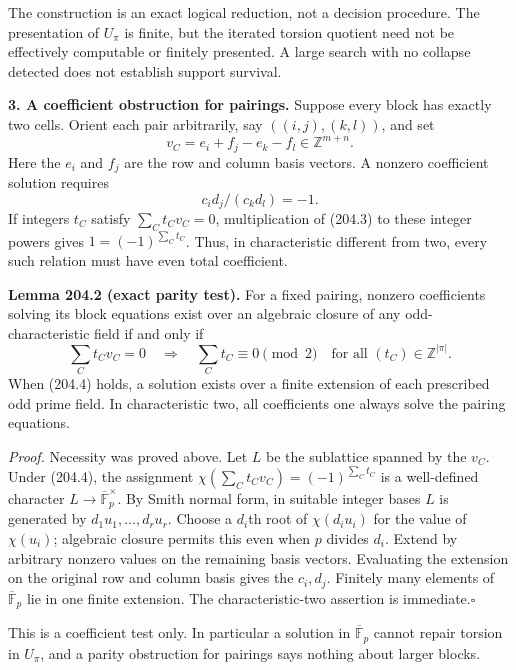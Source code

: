 \documentclass[11pt,a4paper]{article}
\newcommand{\Z}{\mathbb{Z}}
\newcommand{\F}{\mathbb{F}}
\begin{document}
The construction is an exact logical reduction, not a decision procedure.
The presentation of $U_\pi$ is finite, but the iterated torsion quotient
need not be effectively computable or finitely presented. A large search
with no collapse detected does not establish support survival.

\textbf{3. A coefficient obstruction for pairings.}
Suppose every block has exactly two cells. Orient each pair arbitrarily,
say $((i,j),(k,l))$, and set
\[
 v_C=e_i+f_j-e_k-f_l\in\Z^{m+n}.
\]
Here the $e_i$ and $f_j$ are the row and column basis vectors. A nonzero
coefficient solution requires
\[
 c_i d_j/(c_kd_l)=-1. \tag{204.3}
\]
If integers $t_C$ satisfy $\sum_Ct_Cv_C=0$, multiplication of (204.3)
to these integer powers gives $1=(-1)^{\sum_Ct_C}$.
Thus, in characteristic different from two, every such relation must
have even total coefficient.

\textbf{Lemma 204.2 (exact parity test).}
For a fixed pairing, nonzero coefficients solving its block equations
exist over an algebraic closure of any odd-characteristic field if and
only if
\[
 \sum_C t_Cv_C=0\quad\Longrightarrow\quad
 \sum_Ct_C\equiv0\pmod2
 \quad\text{for all }(t_C)\in\Z^{|\pi|}. \tag{204.4}
\]
When (204.4) holds, a solution exists over a finite extension of each
prescribed odd prime field. In characteristic two, all coefficients
one always solve the pairing equations.

\emph{Proof.}
Necessity was proved above. Let $L$ be the sublattice spanned by the
$v_C$. Under (204.4), the assignment
$\chi(\sum_Ct_Cv_C)=(-1)^{\sum_Ct_C}$ is a well-defined character
$L\to\overline{\F}_p^{\times}$. By Smith normal form, in suitable
integer bases $L$ is generated by $d_1u_1,\ldots,d_ru_r$.
Choose a $d_i$th root of $\chi(d_i u_i)$ for the value of $\chi(u_i)$;
algebraic closure permits this even when $p$ divides $d_i$. Extend by
arbitrary nonzero values on the remaining basis vectors. Evaluating the
extension on the original row and column basis gives the $c_i,d_j$.
Finitely many elements of $\overline{\F}_p$ lie in one finite extension.
The characteristic-two assertion is immediate.\hfill$\square$

This is a coefficient test only. In particular a solution in
$\overline{\F}_p$ cannot repair torsion in $U_\pi$, and a parity
obstruction for pairings says nothing about larger blocks.
\end{document}
